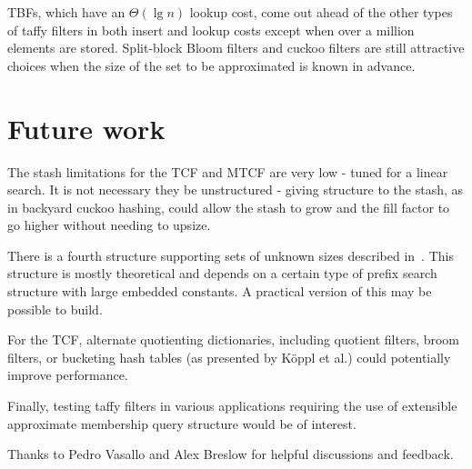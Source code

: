 \documentclass[sigconf, nonacm]{acmart}
\begin{document}
TBFs, which have an $\Theta(\lg n)$ lookup cost, come out ahead of the other types of taffy filters in both insert and lookup costs except when over a million elements are stored.
Split-block Bloom filters and cuckoo filters are still attractive choices when the size of the set to be approximated is known in advance.











\section{Future work}
\label{conclusion}

The stash limitations for the TCF and MTCF are very low - tuned for a linear search.
It is not necessary they be unstructured - giving structure to the stash, as in backyard cuckoo hashing, could allow the stash to grow and the fill factor to go higher without needing to upsize.~\cite{backyard}

There is a fourth structure supporting sets of unknown sizes described in~\cite{unknown-prefix}.
This structure is mostly theoretical and depends on a certain type of prefix search structure with large embedded constants.
A practical version of this may be possible to build.

For the TCF, alternate quotienting dictionaries, including quotient filters, broom filters, or bucketing hash tables (as presented by K\"oppl et al.) could potentially improve performance.~\cite{raman-practical,broom,quotient-filter}

Finally, testing taffy filters in various applications requiring the use of extensible approximate membership query structure would be of interest.

\begin{acks}
Thanks to Pedro Vasallo and Alex Breslow for helpful discussions and feedback.
\end{acks}
\end{document}

